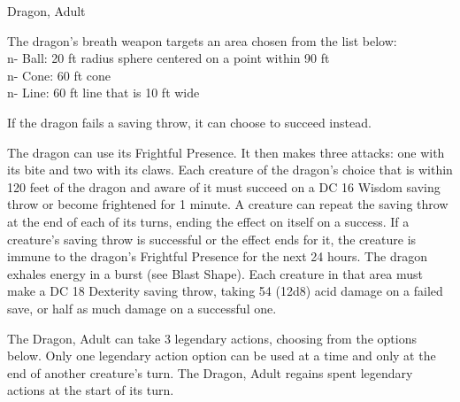 \begin{DndMonster}[float*=b,width=\textwidth + 8pt]{Dragon, Adult}
\begin{multicols}{2}
 The dragon's breath weapon targets an area chosen from the list below:\\n- Ball: 20 ft radius sphere centered on a point within 90 ft\\n- Cone: 60 ft cone\\n- Line: 60 ft line that is 10 ft wide

 If the dragon fails a saving throw, it can choose to succeed instead.

 The dragon can use its Frightful Presence. It then makes three attacks: one with its bite and two with its claws.
\DndMonsterAttack[
	name=Bite,
	distance=melee,
	type=weapon,
	mod=+11,
	reach=10,
	dmg=\DndDice{2d10 + 6},
	dmg-type=piercing,
	extra={ plus 4 (1d8) damage of the dragon's Damage Type.}
]
\DndMonsterAttack[
	name=Claw,
	distance=melee,
	type=weapon,
	mod=+11,
	reach=5,
	dmg=\DndDice{2d6 + 6},
	dmg-type=slashing
]
\DndMonsterAttack[
	name=Tail,
	distance=melee,
	type=weapon,
	mod=+11,
	reach=15,
	dmg=\DndDice{2d8 + 6},
	dmg-type=bludgeoning
]
Each creature of the dragon’s choice that is within 120 feet of the dragon and aware of it must succeed on a DC 16 Wisdom saving throw or become frightened for 1 minute. A creature can repeat the saving throw at the end of each of its turns, ending the effect on itself on a success. If a creature’s saving throw is successful or the effect ends for it, the creature is immune to the dragon’s Frightful Presence for the next 24 hours.
The dragon exhales energy in a burst (see Blast Shape). Each creature in that area must make a DC 18 Dexterity saving throw, taking 54 (12d8) acid damage on a failed save, or half as much damage on a successful one.

The Dragon, Adult can take 3 legendary actions, choosing from the options below. Only one legendary action option can be used at a time and only at the end of another creature's turn. The Dragon, Adult regains spent legendary actions at the start of its turn.
\begin{DndMonsterLegendaryActions}
\end{DndMonsterLegendaryActions}

\end{multicols}
\end{DndMonster}
